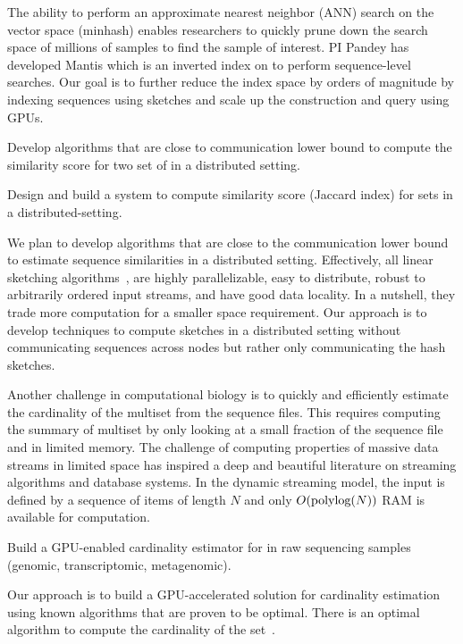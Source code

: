 The ability to perform an approximate nearest neighbor (ANN) search on the vector space (minhash) enables researchers to quickly prune down the search space of millions of samples to find the sample of interest. PI Pandey has developed Mantis which is an inverted index on \kmers to perform sequence-level searches. Our goal is to further reduce the index space by orders of magnitude by indexing sequences using sketches and scale up the construction and query using GPUs.

\begin{rproblem}
Develop algorithms that are close to communication lower bound to compute the similarity score for two set of \kmers in a distributed setting.
\end{rproblem}

\begin{rproblem}
Design and build a system to compute similarity score (Jaccard index) for \kmer sets in a distributed-setting.
\end{rproblem}

We plan to develop algorithms that are close to the communication lower bound to estimate sequence similarities in a distributed setting. Effectively, all linear sketching algorithms~\cite{li2014sketchuniversal}, are highly parallelizable, easy to distribute, robust to arbitrarily ordered input streams, and have good data locality. In a nutshell, they trade more computation for a smaller space requirement. Our approach is to develop techniques to compute sketches in a distributed setting without communicating sequences across nodes but rather only communicating the hash sketches.

Another challenge in computational biology is to quickly and efficiently estimate the cardinality of the \kmer multiset from the sequence files. This requires computing the summary of \kmer multiset by only looking at a small fraction of the sequence file and in limited memory.
%
The challenge of computing properties of massive data streams in limited space has inspired a deep and beautiful literature on streaming algorithms and database systems. In the dynamic streaming model, the input is defined by a sequence of items of length $N$ and only $O(\textrm{polylog}{(N)})$ {RAM} is available for computation.


\begin{rproblem}
Build a GPU-enabled cardinality estimator for \kmers in raw sequencing samples (genomic, transcriptomic, metagenomic).
\end{rproblem}


Our approach is to build a GPU-accelerated solution for cardinality estimation using known algorithms that are proven to be optimal. There is an optimal algorithm to compute the cardinality of the set~\cite{Kane2010}.

